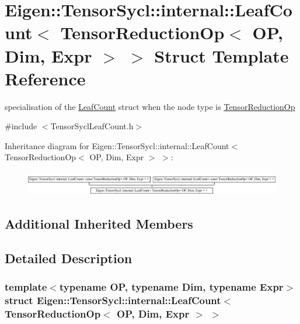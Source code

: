 \hypertarget{struct_eigen_1_1_tensor_sycl_1_1internal_1_1_leaf_count_3_01_tensor_reduction_op_3_01_o_p_00_01_dim_00_01_expr_01_4_01_4}{}\section{Eigen\+:\+:Tensor\+Sycl\+:\+:internal\+:\+:Leaf\+Count$<$ Tensor\+Reduction\+Op$<$ OP, Dim, Expr $>$ $>$ Struct Template Reference}
\label{struct_eigen_1_1_tensor_sycl_1_1internal_1_1_leaf_count_3_01_tensor_reduction_op_3_01_o_p_00_01_dim_00_01_expr_01_4_01_4}


specialisation of the \hyperlink{struct_eigen_1_1_tensor_sycl_1_1internal_1_1_leaf_count}{Leaf\+Count} struct when the node type is \hyperlink{class_eigen_1_1_tensor_reduction_op}{Tensor\+Reduction\+Op}  




{\ttfamily \#include $<$Tensor\+Sycl\+Leaf\+Count.\+h$>$}

Inheritance diagram for Eigen\+:\+:Tensor\+Sycl\+:\+:internal\+:\+:Leaf\+Count$<$ Tensor\+Reduction\+Op$<$ OP, Dim, Expr $>$ $>$\+:\begin{figure}[H]
\begin{center}
\leavevmode
\includegraphics[height=1.093750cm]{struct_eigen_1_1_tensor_sycl_1_1internal_1_1_leaf_count_3_01_tensor_reduction_op_3_01_o_p_00_01_dim_00_01_expr_01_4_01_4}
\end{center}
\end{figure}
\subsection*{Additional Inherited Members}


\subsection{Detailed Description}
\subsubsection*{template$<$typename OP, typename Dim, typename Expr$>$\newline
struct Eigen\+::\+Tensor\+Sycl\+::internal\+::\+Leaf\+Count$<$ Tensor\+Reduction\+Op$<$ O\+P, Dim, Expr $>$ $>$}

